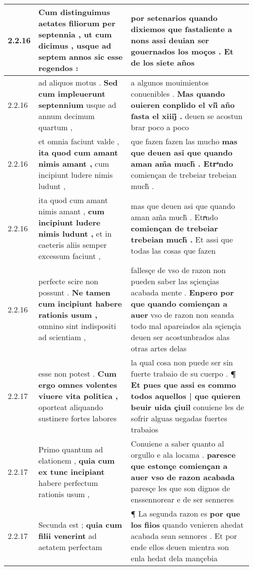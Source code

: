 \begin{tabular}{|p{1cm}|p{6.5cm}|p{6.5cm}|}
2.2.16 & Cum distinguimus aetates filiorum per septennia , \textbf{ ut cum dicimus , } usque ad septem annos sic esse regendos : & por setenarios quando dixiemos que fastaliente a nons \textbf{ assi deuian ser gouernados los moços . } Et de los siete años \\\hline
2.2.16 & ad aliquos motus . \textbf{ Sed cum impleuerunt septennium } usque ad annum decimum quartum , & a algunos mouimientos conuenibles . \textbf{ Mas quando ouieren conplido el vii̊ año fasta el xiiij̊ . } deuen se acostun brar poco a poco \\\hline
2.2.16 & et omnia faciunt valde , \textbf{ ita quod cum amant nimis amant , } cum incipiunt ludere nimis ludunt , & que fazen fazen las mucho \textbf{ mas que deuen asi que quando aman am̃a much̃ . Etrͣndo } comiençan de trebeiar trebeian much̃ . \\\hline
2.2.16 & ita quod cum amant nimis amant , \textbf{ cum incipiunt ludere nimis ludunt , } et in caeteris aliis semper excessum faciunt , & mas que deuen asi que quando aman am̃a much̃ . Etrͣndo \textbf{ comiençan de trebeiar trebeian much̃ . } Et assi que todas las cosas que fazen \\\hline
2.2.16 & perfecte scire non possunt . \textbf{ Ne tamen cum incipiunt habere rationis usum , } omnino sint indispositi ad scientiam , & fallesçe de vso de razon non pueden saber las sçiençias acabada mente . \textbf{ Enpero por que quando comiençan a auer } vso de razon non seanda todo mal apareiados ala sçiençia deuen ser acostunbrados alas otras artes delas \\\hline
2.2.17 & esse non potest . \textbf{ Cum ergo omnes volentes viuere vita politica , } oporteat aliquando sustinere fortes labores & la qual cosa non puede ser sin fuerte trabaio de su cuerpo . \textbf{ ¶ Et pues que assi es commo todos aquellos | que quieren beuir uida çiuil } conuiene les de sofrir alguas uegadas fuertes trabaios \\\hline
2.2.17 & Primo quantum ad elationem , \textbf{ quia cum ex tunc incipiant } habere perfectum rationis usum , & Conuiene a saber quanto al orgullo e ala locama . \textbf{ paresce que estonçe comiençan a auer vso de razon acabada } paresçe les que son dignos de enssennorear e de ser senneres \\\hline
2.2.17 & Secunda est ; \textbf{ quia cum filii venerint } ad aetatem perfectam & ¶ La segunda razon es \textbf{ por que los fiios } quando venieren ahedat acabada sean sennores . Et por ende ellos deuen mientra son enla hedat dela mançebia \\\hline

\end{tabular}
